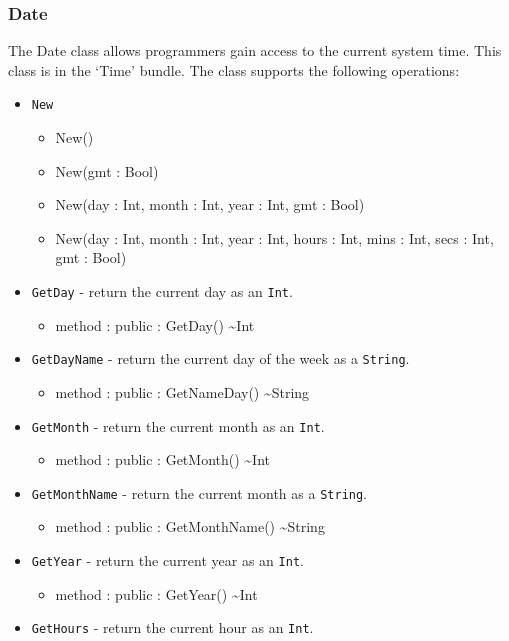 \documentclass[11pt]{article}
\begin{document}
\subsubsection{Date}
The Date class allows programmers gain access to the current system
time.  This class is in the `Time' bundle.  The class supports the following operations:
\begin{itemize}
\item \texttt{New}
  \begin{itemize}
  \item New()
  \item New(gmt : Bool)
  \item New(day : Int, month : Int, year : Int, gmt : Bool)
  \item New(day : Int, month : Int, year : Int, hours : Int, mins : Int, secs : Int, gmt : Bool)
  \end{itemize}
\item \texttt{GetDay} - return the current day as an \texttt{Int}.
  \begin{itemize}
  \item method : public : GetDay() \textasciitilde Int
  \end{itemize}
\item \texttt{GetDayName} - return the current day of the week as a \texttt{String}.
  \begin{itemize}
  \item method : public : GetNameDay() \textasciitilde String
  \end{itemize}
\item \texttt{GetMonth} - return the current month as an \texttt{Int}.
  \begin{itemize}
  \item method : public : GetMonth() \textasciitilde Int
  \end{itemize}
\item \texttt{GetMonthName} - return the current month as a \texttt{String}.
  \begin{itemize}
  \item method : public : GetMonthName() \textasciitilde String
  \end{itemize}
\item \texttt{GetYear} - return the current year as an \texttt{Int}.
  \begin{itemize}
  \item method : public : GetYear() \textasciitilde Int
  \end{itemize}
\item \texttt{GetHours} - return the current hour as an \texttt{Int}.

\end{itemize}
\end{document}

